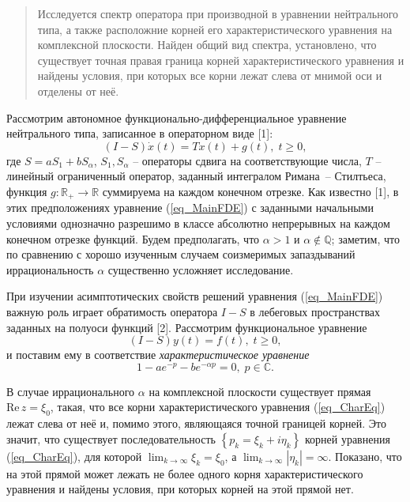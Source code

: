 \begin{abstract}
Исследуется спектр оператора при производной в уравнении нейтрального типа, а также расположние корней его характеристического уравнения на комплексной плоскости. Найден общий вид спектра, установлено, что существует точная правая граница корней характеристического уравнения и найдены условия, при которых все корни лежат слева от мнимой оси и отделены от неё.

\end{abstract}


Рассмотрим автономное функционально-дифференциальное уравнение нейтрального типа, записанное в операторном виде [1]:
\begin{equation} \label{eq_MainFDE}
    (I-S)\dot{x}(t)=Tx(t)+g(t),\;t\ge0,
\end{equation}
где  \(S=aS_1+bS_{\alpha}\), \(S_1, S_{\alpha}\) -- операторы сдвига на соответствующие числа, \(T\) -- линейный ограниченный оператор, заданный интегралом Римана~-- Стилтьеса, функция \(g: \mathbb{R}_+\to\mathbb{R}\) суммируема на каждом конечном отрезке. Как известно [1], в этих предположениях уравнение (\ref{eq_MainFDE}) с заданными начальными условиями однозначно разрешимо в классе абсолютно непрерывных на каждом конечном отрезке функций. Будем предполагать, что \(\alpha>1\) и \(\alpha\notin\mathbb{Q}\); заметим, что по сравнению с хорошо изученным случаем соизмеримых запаздываний иррациональность \(\alpha\) существенно усложняет исследование.\par
При изучении асимптотических свойств решений уравнения (\ref{eq_MainFDE}) важную роль играет обратимость оператора \(I-S\) в лебеговых пространствах заданных на полуоси функций [2]. Рассмотрим функциональное уравнение
\begin{equation*}
    (I-S)y(t)=f(t),\; t\ge0,
\end{equation*}
и поставим ему в соответствие \emph{характеристическое уравнение}
\begin{equation} \label{eq_CharEq}
    1-ae^{-p}-be^{-\alpha p}=0,\;p\in\mathbb{C}.
\end{equation}\par
В случае иррационального \(\alpha\) на комплексной плоскости существует прямая \(\mathrm{Re}\,{z}=\xi_0\), такая, что все корни характеристического уравнения (\ref{eq_CharEq}) лежат слева от неё и, помимо этого, являющаяся точной границей корней. Это значит, что существует последовательность \(\left\{p_k=\xi_k+i\eta_k\right\}\) корней уравнения (\ref{eq_CharEq}), для которой \(\displaystyle\lim_{k\to\infty}{\xi_k}=\xi_0\), а \(\displaystyle\lim_{k\to\infty}{\left|\eta_k\right|}=\infty\). Показано, что на этой прямой может лежать не более одного корня характеристического уравнения и найдены условия, при которых корней на этой прямой нет.

